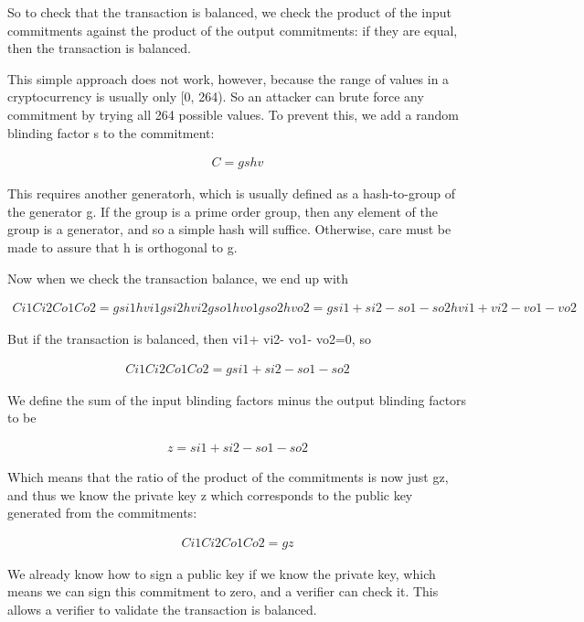 \documentclass{article}
\begin{document}
So to check that the transaction is balanced, we check the product of the input commitments against the product of the output commitments: if they are equal, then the transaction is balanced.

This simple approach does not work, however, because the range of values in a cryptocurrency is usually only [0, 264).  So an attacker can brute force any commitment by trying all 264 possible values.  To prevent this, we add a random blinding factor s to the commitment:

\begin{eqnarray}
  C=gshv
\end{eqnarray}
  
This requires another generatorh, which is usually defined as a hash-to-group of the generator g.  If the group is a prime order group, then any element of the group is a generator, and so a simple hash will suffice.  Otherwise, care must be made to assure that h is orthogonal to g. 

Now when we check the transaction balance, we end up with 

\begin{eqnarray}
  Ci1Ci2Co1Co2=gsi1hvi1gsi2hvi2gso1hvo1gso2hvo2=gsi1+ si2- so1- so2hvi1+ vi2- vo1- vo2
\end{eqnarray}

But if the transaction is balanced, then vi1+ vi2- vo1- vo2=0, so 

\begin{eqnarray}
  Ci1Ci2Co1Co2=gsi1+ si2- so1- so2
\end{eqnarray}

We define the sum of the input blinding factors minus the output blinding factors to be

\begin{eqnarray}
  z=si1+ si2- so1- so2
\end{eqnarray}

Which means that the ratio of the product of the commitments is now just gz, and thus we know the private key z which corresponds to the public key generated from the commitments:

\begin{eqnarray}
  Ci1Ci2Co1Co2=gz
\end{eqnarray}

We already know how to sign a public key if we know the private key, which means we can sign this commitment to zero, and a verifier can check it.  This allows a verifier to validate the transaction is balanced.
\end{document}
